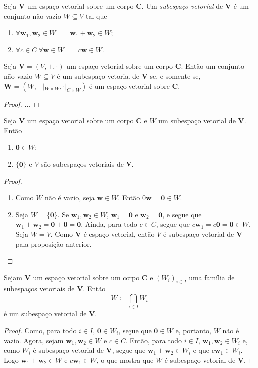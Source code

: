 \begin{defi}
	Seja $\bm V$ um espaço vetorial sobre um corpo $\bm C$. Um \emph{subespaço vetorial} de $\bm V$ é um conjunto não vazio $W \subseteq V$ tal que
	\begin{enumerate}
	\item $\forall \bm w_1,\bm w_2 \in W \qquad \bm w_1 + \bm w_2 \in W$;
	\item $\forall c \in C \ \forall \bm w \in W \qquad c \bm w \in W$.
	\end{enumerate}
\end{defi}

\begin{prop}
	Seja $\bm V=(V,+,\cdot)$ um espaço vetorial sobre um corpo $\bm C$. Então um conjunto não vazio $W \subseteq V$ é um subespaço vetorial de $\bm V$ se, e somente se, $\bm W=(W,+|_{W \times W},\cdot|_{C \times W})$ é um espaço vetorial sobre $\bm C$.
\end{prop}
\begin{proof}
...
\end{proof}

\begin{prop}
	Seja $\bm V$ um espaço vetorial sobre um corpo $\bm C$ e $W$ um subespaço vetorial de $\bm V$. Então
	\begin{enumerate}
	\item $\bm 0 \in W$;
	\item $\{\bm 0\}$ e $V$ são subespaços vetoriais de $\bm V$.
	\end{enumerate}
\end{prop}
\begin{proof}
	\begin{enumerate}
	\item Como $W$ não é vazio, seja $\bm w \in W$. Então $0 \bm w = \bm 0 \in W$.
	\item Seja $W=\{\bm 0\}$. Se $\bm w_1,\bm w_2 \in W$, $\bm w_1 = \bm 0$ e $\bm w_2 =\bm 0$, e segue que $\bm w_1 + \bm w_2 = \bm 0 + \bm 0 = \bm 0$. Ainda, para todo $c \in C$, segue que $c\bm w_1 = c\bm 0=\bm 0 \in W$.
	Seja $W=V$. Como $\bm V$ é espaço vetorial, então $V$ é subespaço vetorial de $\bm V$ pala proposição anterior. \qedhere
	\end{enumerate}
\end{proof}

\begin{prop}
	Sejam $\bm V$ um espaço vetorial sobre um corpo $\bm C$ e $(W_i)_{i \in I}$ uma família de subespaços vetoriais de $\bm V$. Então
	\begin{equation*}
	W \coloneqq \bigcap_{i \in I} W_i
	\end{equation*}
é um subespaço vetorial de $\bm V$.
\end{prop}
\begin{proof}
	Como, para todo $i \in I$, $\bm 0 \in W_i$, segue que $\bm 0 \in W$ e, portanto, $W$ não é vazio. Agora, sejam $\bm w_1,\bm w_2 \in W$ e $c \in C$. Então, para todo $i \in I$, $\bm w_1,\bm w_2 \in W_i$ e, como $W_i$ é subespaço vetorial de $\bm V$, segue que $\bm w_1+\bm w_2 \in W_i$ e que $c\bm w_1 \in W_i$. Logo $\bm w_1+\bm w_2 \in W$ e $c\bm w_1 \in W$, o que mostra que $W$ é subespaço vetorial de $\bm V$.
\end{proof}

